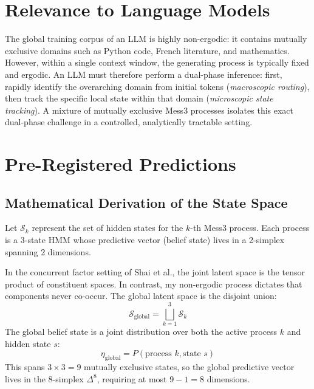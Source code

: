 \documentclass[11pt]{article}
\begin{document}
\section{Relevance to Language Models}

The global training corpus of an LLM is highly non-ergodic: it contains mutually exclusive domains such as Python code, French literature, and mathematics. However, within a single context window, the generating process is typically fixed and ergodic. An LLM must therefore perform a dual-phase inference: first, rapidly identify the overarching domain from initial tokens (\emph{macroscopic routing}), then track the specific local state within that domain (\emph{microscopic state tracking}). A mixture of mutually exclusive Mess3 processes isolates this exact dual-phase challenge in a controlled, analytically tractable setting.

\section{Pre-Registered Predictions}

\subsection{Mathematical Derivation of the State Space}
Let $\mathcal{S}_k$ represent the set of hidden states for the $k$-th Mess3 process. Each process is a 3-state HMM whose predictive vector (belief state) lives in a 2-simplex spanning 2 dimensions.

In the concurrent factor setting of Shai et al., the joint latent space is the tensor product of constituent spaces. In contrast, my non-ergodic process dictates that components never co-occur. The global latent space is the disjoint union:
\begin{equation}
    \mathcal{S}_{\text{global}} = \bigsqcup_{k=1}^{3} \mathcal{S}_k
\end{equation}
The global belief state is a joint distribution over both the active process $k$ and hidden state $s$:
\begin{equation}
    \eta_{\text{global}} = P(\text{process } k, \text{state } s)
\end{equation}
This spans $3 \times 3 = 9$ mutually exclusive states, so the global predictive vector lives in the 8-simplex $\Delta^8$, requiring at most $9 - 1 = 8$ dimensions.
\end{document}
